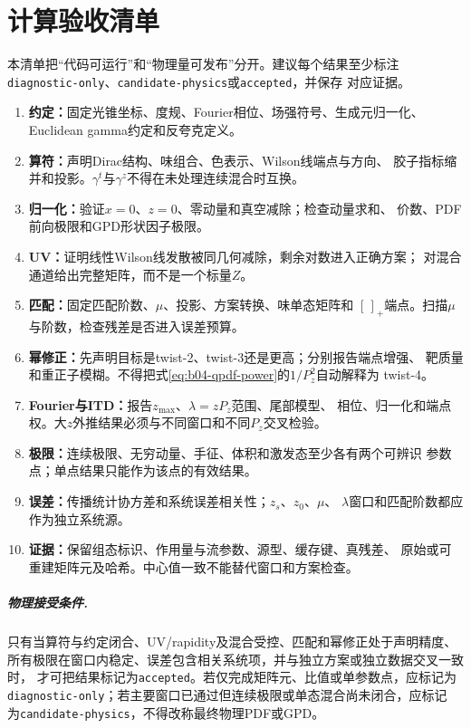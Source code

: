 \chapter{计算验收清单}

本清单把“代码可运行”和“物理量可发布”分开。建议每个结果至少标注
\texttt{diagnostic-only}、\texttt{candidate-physics}或\texttt{accepted}，并保存
对应证据。

\begin{enumerate}
  \item \textbf{约定：}固定光锥坐标、度规、Fourier相位、场强符号、生成元归一化、
  Euclidean gamma约定和反夸克定义。
  \item \textbf{算符：}声明Dirac结构、味组合、色表示、Wilson线端点与方向、
  胶子指标缩并和投影。$\gamma^t$与$\gamma^z$不得在未处理连续混合时互换。
  \item \textbf{归一化：}验证$x=0$、$z=0$、零动量和真空减除；检查动量求和、
  价数、PDF前向极限和GPD形状因子极限。
  \item \textbf{UV：}证明线性Wilson线发散被同几何减除，剩余对数进入正确方案；
  对混合通道给出完整矩阵，而不是一个标量$Z$。
  \item \textbf{匹配：}固定匹配阶数、$\mu$、投影、方案转换、味单态矩阵和
  $[\,]_+$端点。扫描$\mu$与阶数，检查残差是否进入误差预算。
  \item \textbf{幂修正：}先声明目标是twist-2、twist-3还是更高；分别报告端点增强、
  靶质量和重正子模糊。不得把式\eqref{eq:b04-qpdf-power}的$1/P_z^2$自动解释为
  twist-4。
  \item \textbf{Fourier与ITD：}报告$z_{\max}$、$\lambda=zP_z$范围、尾部模型、
  相位、归一化和端点权。大$z$外推结果必须与不同窗口和不同$P_z$交叉检验。
  \item \textbf{极限：}连续极限、无穷动量、手征、体积和激发态至少各有两个可辨识
  参数点；单点结果只能作为该点的有效结果。
  \item \textbf{误差：}传播统计协方差和系统误差相关性；$z_s$、$z_0$、$\mu$、
  $\lambda$窗口和匹配阶数都应作为独立系统源。
  \item \textbf{证据：}保留组态标识、作用量与流参数、源型、缓存键、真残差、
  原始或可重建矩阵元及哈希。中心值一致不能替代窗口和方案检查。
\end{enumerate}

\paragraph{物理接受条件.}
只有当算符与约定闭合、UV/rapidity及混合受控、匹配和幂修正处于声明精度、
所有极限在窗口内稳定、误差包含相关系统项，并与独立方案或独立数据交叉一致时，
才可把结果标记为\texttt{accepted}。若仅完成矩阵元、比值或单参数点，应标记为
\texttt{diagnostic-only}；若主要窗口已通过但连续极限或单态混合尚未闭合，应标记
为\texttt{candidate-physics}，不得改称最终物理PDF或GPD。
